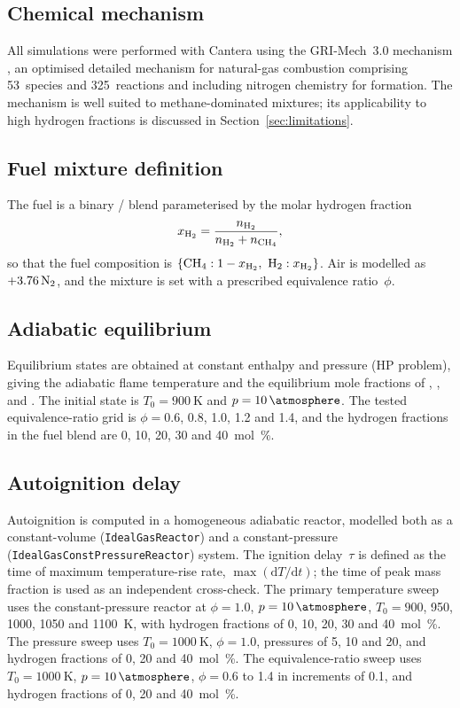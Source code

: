 \documentclass[11pt]{article}
\begin{document}
\subsection{Chemical mechanism}
All simulations were performed with Cantera \citep{cantera} using the
GRI-Mech~3.0 mechanism \citep{grimech30}, an optimised detailed mechanism for
natural-gas combustion comprising 53~species and 325~reactions and including
nitrogen chemistry for  formation. The mechanism is well suited to
methane-dominated mixtures; its applicability to high hydrogen fractions is
discussed in Section~\ref{sec:limitations}.

\subsection{Fuel mixture definition}
The fuel is a binary / blend parameterised by the molar hydrogen
fraction
\begin{equation}
  x_{\ce{H2}} = \frac{n_{\ce{H2}}}{n_{\ce{H2}} + n_{\ce{CH4}}},
\end{equation}
so that the fuel composition is $\{\ce{CH4}: 1-x_{\ce{H2}},\ \ce{H2}: x_{\ce{H2}}\}$.
Air is modelled as  $+ 3.76\,\ce{N2}$, and the mixture is set with a
prescribed equivalence ratio~$\phi$.

\subsection{Adiabatic equilibrium}
Equilibrium states are obtained at constant enthalpy and pressure
($\mathrm{HP}$ problem), giving the adiabatic flame temperature and the
equilibrium mole fractions of , ,  and . The
initial state is $T_0=\SI{900}{\kelvin}$ and
$p=\SI{10}{\atmosphere}$. The tested equivalence-ratio grid is
$\phi=0.6$, 0.8, 1.0, 1.2 and 1.4, and the hydrogen fractions in the fuel
blend are 0, 10, 20, 30 and \SI{40}{\mole\percent}.

\subsection{Autoignition delay}
Autoignition is computed in a homogeneous adiabatic reactor, modelled both as a
constant-volume (\texttt{IdealGasReactor}) and a constant-pressure
(\texttt{IdealGasConstPressureReactor}) system. The ignition delay~$\tau$ is
defined as the time of maximum temperature-rise rate, $\max(\mathrm{d}T/\mathrm{d}t)$;
the time of peak  mass fraction is used as an independent cross-check.
The primary temperature sweep uses the constant-pressure reactor at
$\phi=1.0$, $p=\SI{10}{\atmosphere}$, $T_0=900$, 950, 1000, 1050 and
\SI{1100}{\kelvin}, with hydrogen fractions of 0, 10, 20, 30 and
\SI{40}{\mole\percent}. The pressure sweep uses $T_0=\SI{1000}{\kelvin}$,
$\phi=1.0$, pressures of 5, 10 and \SI{20}{\atmosphere}, and hydrogen
fractions of 0, 20 and \SI{40}{\mole\percent}. The equivalence-ratio sweep
uses $T_0=\SI{1000}{\kelvin}$, $p=\SI{10}{\atmosphere}$, $\phi=0.6$ to 1.4
in increments of 0.1, and hydrogen fractions of 0, 20 and
\SI{40}{\mole\percent}.
\end{document}
